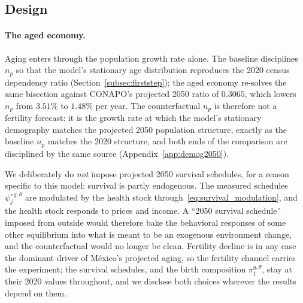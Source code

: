 \documentclass[12pt,a4paper]{article}
\begin{document}
\subsection{Design}
\label{subsec:cf_design}

\paragraph{The aged economy.} Aging enters through the population growth rate alone. The baseline disciplines $n_p$ so that the model's stationary age distribution reproduces the 2020 census dependency ratio (Section~\ref{subsec:firststep}); the aged economy re-solves the same bisection against CONAPO's projected 2050 ratio of $0.3065$, which lowers $n_p$ from $3.51\%$ to $1.48\%$ per year. The counterfactual $n_p$ is therefore not a fertility forecast: it is the growth rate at which the model's stationary demography matches the projected 2050 population structure, exactly as the baseline $n_p$ matches the 2020 structure, and both ends of the comparison are disciplined by the same source (Appendix~\ref{app:demog2050}).

We deliberately do \emph{not} impose projected 2050 survival schedules, for a reason specific to this model: survival is partly endogenous. The measured schedules $\psi^{\circ\,g,\theta}_j$ are modulated by the health stock through~\eqref{eq:survival_modulation}, and the health stock responds to prices and income. A ``2050 survival schedule'' imposed from outside would therefore bake the behavioral responses of some other equilibrium into what is meant to be an exogenous environment change, and the counterfactual would no longer be clean. Fertility decline is in any case the dominant driver of M\'exico's projected aging, so the fertility channel carries the experiment; the survival schedules, and the birth composition $\pi^{g,\theta}_1$, stay at their 2020 values throughout, and we disclose both choices wherever the results depend on them.
\end{document}
